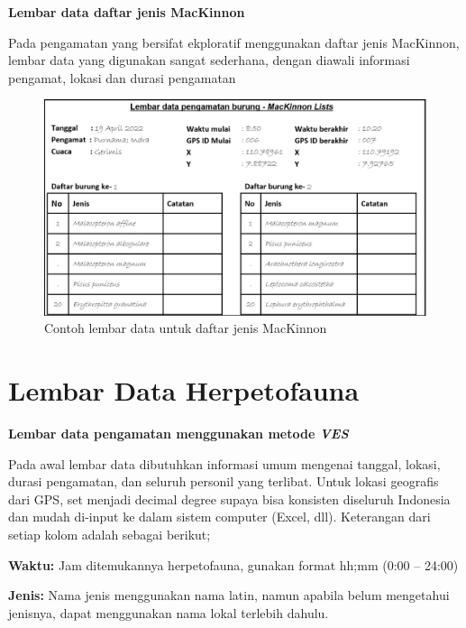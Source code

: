 \documentclass[
  oneside]{book}
\begin{document}
\textbf{Lembar data daftar jenis MacKinnon}

Pada pengamatan yang bersifat ekploratif menggunakan daftar jenis MacKinnon, lembar data yang digunakan sangat sederhana, dengan diawali informasi pengamat, lokasi dan durasi pengamatan

\begin{figure}

{\centering \includegraphics[width=1\linewidth]{images/ldp_ml} 

}

\caption{Contoh lembar data untuk daftar jenis MacKinnon}\label{fig:ldpml}
\end{figure}

\hypertarget{lembar-data-herpetofauna}{%
\section*{Lembar Data Herpetofauna}\label{lembar-data-herpetofauna}}

\textbf{Lembar data pengamatan menggunakan metode \emph{VES}}

Pada awal lembar data dibutuhkan informasi umum mengenai tanggal, lokasi, durasi pengamatan, dan seluruh personil yang terlibat. Untuk lokasi geografis dari GPS, set menjadi decimal degree supaya bisa konsisten diseluruh Indonesia dan mudah di-input ke dalam sistem computer (Excel, dll). Keterangan dari setiap kolom adalah sebagai berikut;

\textbf{Waktu:} Jam ditemukannya herpetofauna, gunakan format hh;mm (0:00 -- 24:00)

\textbf{Jenis:} Nama jenis menggunakan nama latin, namun apabila belum mengetahui jenisnya, dapat menggunakan nama lokal terlebih dahulu.
\end{document}
